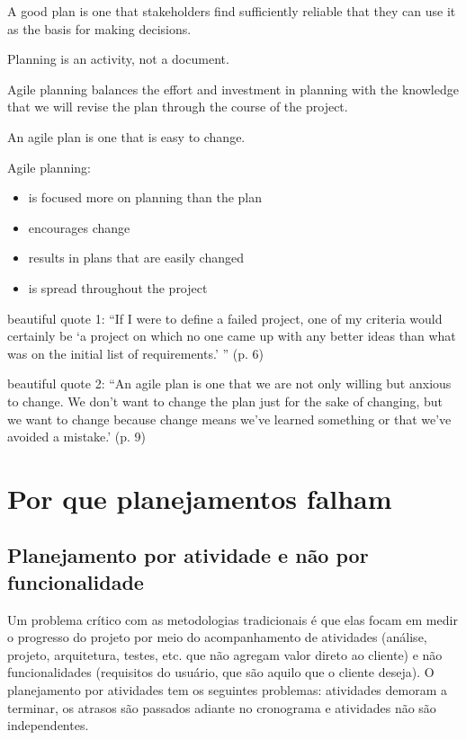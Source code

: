 \documentclass[a4paper,abntfigtabnum,noindentfirst]{abnt}
\begin{document}
A good plan is one that stakeholders find sufficiently reliable that they can use it as the basis for making decisions.

Planning is an activity, not a document.

Agile planning balances the effort and investment in planning with the knowledge that we will revise the plan through the course of the project.

An agile plan is one that is easy to change.

Agile planning:
\begin{itemize}
\item is focused more on planning than the plan

\item encourages change

\item results in plans that are easily changed

\item is spread throughout the project
\end{itemize}

beautiful quote 1:
``If I were to define a failed project, one of my criteria would
certainly be `a project on which no one came up with any better ideas
than what was on the initial list of requirements.' '' (p. 6)

beautiful quote 2:
``An agile plan is one that we are not only willing but anxious to
change. We don't want to change the plan just for the sake of
changing, but we want to change because change means we've learned
something or that we've avoided a mistake.' (p. 9)


\chapter{Por que planejamentos falham}

\section{Planejamento por atividade e não por funcionalidade}

Um problema crítico com as metodologias tradicionais é que elas focam em medir o progresso do projeto por meio do acompanhamento de atividades (análise, projeto, arquitetura, testes, etc. que não agregam valor direto ao cliente) e não funcionalidades (requisitos do usuário, que são aquilo que o cliente deseja). O planejamento por atividades tem os seguintes problemas: atividades demoram a terminar, os atrasos são passados adiante no cronograma e atividades não são independentes.
\end{document}
